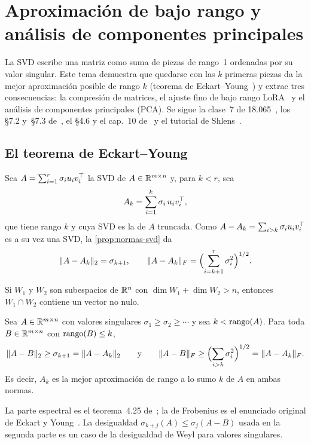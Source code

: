\chapter{Aproximación de bajo rango y análisis de componentes principales}
\label{tema:5}

La SVD escribe una matriz como suma de piezas de rango~1 ordenadas por su valor singular. Este tema demuestra que quedarse con las $k$ primeras piezas da la mejor aproximación posible de rango $k$ (teorema de Eckart--Young~\cite{eckart-young}) y extrae tres consecuencias: la compresión de matrices, el ajuste fino de bajo rango LoRA~\cite{hu-lora} y el análisis de componentes principales (PCA). Se sigue la clase~7 de 18.065~\cite{mit18065}, los §7.2 y~§7.3 de~\cite{strang-ila}, el §4.6 y el cap.~10 de~\cite{mml} y el tutorial de Shlens~\cite{shlens}.

\section{El teorema de Eckart--Young}

Sea $A=\sum_{i=1}^{r}\sigma_iu_iv_i^{\top}$ la SVD de $A\in\mathbb{R}^{m\times n}$ y, para $k<r$, sea
\[
A_k=\sum_{i=1}^{k}\sigma_i\,u_iv_i^{\top},
\]
que tiene rango $k$ y cuya SVD es la de $A$ truncada. Como $A-A_k=\sum_{i>k}\sigma_iu_iv_i^{\top}$ es a su vez una SVD, la \cref{prop:normas-svd} da
\[
\lVert A-A_k\rVert_2=\sigma_{k+1},\qquad \lVert A-A_k\rVert_F=\Bigl(\sum_{i=k+1}^{r}\sigma_i^{2}\Bigr)^{1/2}.
\]

\begin{lema}\label{lem:interseccion}
Si $W_1$ y $W_2$ son subespacios de $\mathbb{R}^{n}$ con $\dim W_1+\dim W_2>n$, entonces $W_1\cap W_2$ contiene un vector no nulo.
\end{lema}

\begin{teorema}\label{teo:eckart-young}
Sea $A\in\mathbb{R}^{m\times n}$ con valores singulares $\sigma_1\ge\sigma_2\ge\cdots$ y sea $k<\operatorname{rango}(A)$. Para toda $B\in\mathbb{R}^{m\times n}$ con $\operatorname{rango}(B)\le k$,
\[
\lVert A-B\rVert_2\ge\sigma_{k+1}=\lVert A-A_k\rVert_2
\qquad\text{y}\qquad
\lVert A-B\rVert_F\ge\Bigl(\sum_{i>k}\sigma_i^{2}\Bigr)^{1/2}=\lVert A-A_k\rVert_F.
\]
Es decir, $A_k$ es la mejor aproximación de rango a lo sumo $k$ de $A$ en ambas normas.
\end{teorema}

La parte espectral es el teorema~4.25 de~\cite{mml}; la de Frobenius es el enunciado original de Eckart y Young~\cite{eckart-young}. La desigualdad $\sigma_{k+j}(A)\le\sigma_j(A-B)$ usada en la segunda parte es un caso de la desigualdad de Weyl para valores singulares.

